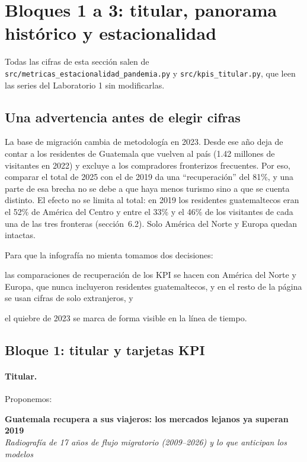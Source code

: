 \section{Bloques 1 a 3: titular, panorama histórico y estacionalidad}

Todas las cifras de esta sección salen de \texttt{src/metricas\_estacionalidad\_pandemia.py}
y \texttt{src/kpis\_titular.py}, que leen las series del Laboratorio 1 sin
modificarlas.

\subsection{Una advertencia antes de elegir cifras}

La base de migración cambia de metodología en 2023. Desde ese año deja de contar
a los residentes de Guatemala que vuelven al país (1.42 millones de visitantes en
2022) y excluye a los compradores fronterizos frecuentes. Por eso, comparar el
total de 2025 con el de 2019 da una ``recuperación'' del 81\%, y una parte de esa
brecha no se debe a que haya menos turismo sino a que se cuenta distinto. El
efecto no se limita al total: en 2019 los residentes guatemaltecos eran el 52\% de
América del Centro y entre el 33\% y el 46\% de los visitantes de cada una de las
tres fronteras (sección~6.2). Solo América del Norte y Europa quedan intactas.

Para que la infografía no mienta tomamos dos decisiones:
\begin{enumerate*}[label=(\roman*)]
  \item las comparaciones de recuperación de los KPI se hacen con América del
  Norte y Europa, que nunca incluyeron residentes guatemaltecos, y en el resto de
  la página se usan cifras de solo extranjeros, y
  \item el quiebre de 2023 se marca de forma visible en la línea de tiempo.
\end{enumerate*}

\subsection{Bloque 1: titular y tarjetas KPI}

\paragraph{Titular.} Proponemos:

\begin{center}
{\large\bfseries Guatemala recupera a sus viajeros: los mercados lejanos ya superan 2019}\\[0.3em]
{\itshape Radiografía de 17 años de flujo migratorio (2009--2026) y lo que anticipan los modelos}
\end{center}

